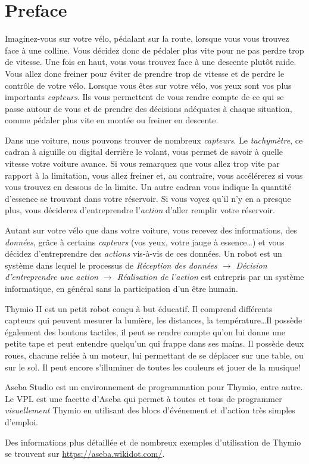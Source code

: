 \thispagestyle{empty}
\chapter*{Preface}


Imaginez-vous sur votre vélo, pédalant sur la route, lorsque vous vous trouvez face à une colline. Vous décidez donc de pédaler plus vite pour ne pas perdre trop de vitesse. Une fois en haut, vous vous trouvez face à une descente plutôt raide. Vous allez donc freiner pour éviter de prendre trop de vitesse et de perdre le contrôle de votre vélo. Lorsque vous êtes sur votre vélo, vos yeux sont vos plus importants \textit{capteurs}. Ils vous permettent de vous rendre compte de ce qui se passe autour de vous et de prendre des décisions adéquates à chaque situation, comme pédaler plus vite en montée ou freiner en descente.

Dans une voiture, nous pouvons trouver de nombreux \textit{capteurs}. Le \textit{tachymètre}, ce cadran à aiguille ou digital derrière le volant, vous permet de savoir à quelle vitesse votre voiture avance. Si vous remarquez que vous allez trop vite par rapport à la limitation, vous allez freiner et, au contraire, vous accélérerez si vous vous trouvez en dessous de la limite. Un autre cadran vous indique la quantité d'essence se trouvant dans votre réservoir. Si vous voyez qu'il n'y en a presque plus, vous déciderez d'entreprendre l'\textit{action} d'aller remplir votre réservoir.
 
Autant sur votre vélo que dans votre voiture, vous recevez des informations, des \textit{données}, grâce à certains \textit{capteurs} (vos yeux, votre jauge à essence\ldots) et vous décidez d'entreprendre des \textit{actions} vis-à-vis de ces données. Un robot est un système dans lequel le processus de \textit{Réception des données $\rightarrow$ Décision d'entreprendre une action $\rightarrow$ Réalisation de l'action} est entrepris par un système informatique, en général sans la participation d'un être humain.


Thymio II est un petit robot conçu à but éducatif. Il comprend différents capteurs qui peuvent mesurer la lumière, les distances, la température\ldots  Il possède également des boutons tactiles, il peut se rendre compte qu'on lui donne une petite tape et peut entendre quelqu'un qui frappe dans ses mains. Il possède deux roues, chacune reliée à un moteur, lui permettant de se déplacer sur une table, ou sur le sol. Il peut encore s'illuminer de toutes les couleurs et jouer de la musique!

Aseba Studio est un environnement de programmation pour Thymio, entre autre. Le VPL est une facette d'Aseba qui permet à toutes et tous de programmer \textit{visuellement} Thymio en utilisant des blocs d'événement et d'action très simples d'emploi.

Des informations plus détaillée et de nombreux exemples d'utilisation de Thymio se trouvent sur \url{https://aseba.wikidot.com/}.

\tableofcontents